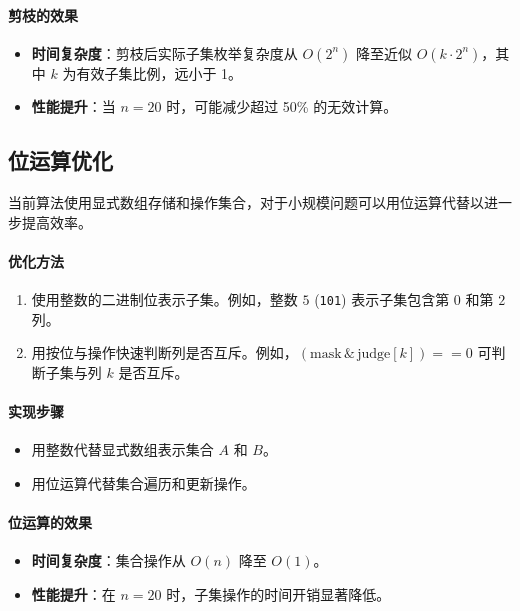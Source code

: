 \documentclass[UTF8]{ctexart}
\begin{document}
\paragraph{剪枝的效果}
\begin{itemize}
    \item \textbf{时间复杂度}：剪枝后实际子集枚举复杂度从 $O(2^n)$ 降至近似 $O(k \cdot 2^n)$，其中 $k$ 为有效子集比例，远小于 1。
    \item \textbf{性能提升}：当 $n = 20$ 时，可能减少超过 50\% 的无效计算。
\end{itemize}

\subsection{位运算优化}
当前算法使用显式数组存储和操作集合，对于小规模问题可以用位运算代替以进一步提高效率。
\paragraph{优化方法}
\begin{enumerate}
    \item 使用整数的二进制位表示子集。例如，整数 $5$ (\texttt{101}) 表示子集包含第 $0$ 和第 $2$ 列。
    \item 用按位与操作快速判断列是否互斥。例如，$(\text{mask} \, \& \, \text{judge}[k]) == 0$ 可判断子集与列 $k$ 是否互斥。
\end{enumerate}

\paragraph{实现步骤}
\begin{itemize}
    \item 用整数代替显式数组表示集合 $A$ 和 $B$。
    \item 用位运算代替集合遍历和更新操作。
\end{itemize}

\paragraph{位运算的效果}
\begin{itemize}
    \item \textbf{时间复杂度}：集合操作从 $O(n)$ 降至 $O(1)$。
    \item \textbf{性能提升}：在 $n = 20$ 时，子集操作的时间开销显著降低。
\end{itemize}
\end{document}
